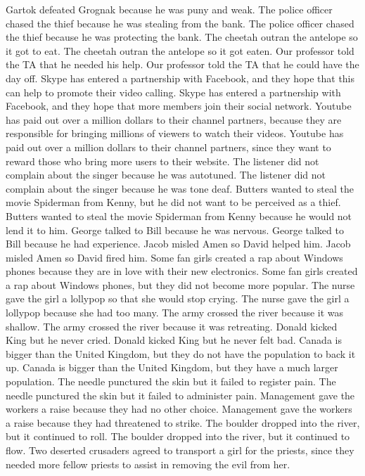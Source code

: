 \documentclass{article}
\begin{document}
\begin{enumerate}
	Gartok defeated Grognak because he was puny and weak.
	The police officer chased the thief because he was stealing from the bank.
	The police officer chased the thief because he was protecting the bank.
	The cheetah outran the antelope so it got to eat.
	The cheetah outran the antelope so it got eaten.
	Our professor told the TA that he needed his help.
	Our professor told the TA that he could have the day off.
	Skype has entered a partnership with Facebook, and they hope that this can help to promote their video calling.
	Skype has entered a partnership with Facebook, and they hope that more members join their social network.
	Youtube has paid out over a million dollars to their channel partners, because they are responsible for bringing millions of viewers to watch their videos.
	Youtube has paid out over a million dollars to their channel partners, since they want to reward those who bring more users to their website.
	The listener did not complain about the singer because he was autotuned.
	The listener did not complain about the singer because he was tone deaf.
	Butters wanted to steal the movie Spiderman from Kenny, but he did not want to be perceived as a thief.
	Butters wanted to steal the movie Spiderman from Kenny because he would not lend it to him.
	George talked to Bill because he was nervous.
	George talked to Bill because he had experience.
	Jacob misled Amen so David helped him.
	Jacob misled Amen so David fired him.
	Some fan girls created a rap about Windows phones because they are in love with their new electronics.
	Some fan girls created a rap about Windows phones, but they did not become more popular.
	The nurse gave the girl a lollypop so that she would stop crying.
	The nurse gave the girl a lollypop because she had too many.
	The army crossed the river because it was shallow.
	The army crossed the river because it was retreating.
	Donald kicked King but he never cried.
	Donald kicked King but he never felt bad.
	Canada is bigger than the United Kingdom, but they do not have the population to back it up.
	Canada is bigger than the United Kingdom, but they have a much larger population.
	The needle punctured the skin but it failed to register pain.
	The needle punctured the skin but it failed to administer pain.
	Management gave the workers a raise because they had no other choice.
	Management gave the workers a raise because they had threatened to strike.
	The boulder dropped into the river, but it continued to roll.
	The boulder dropped into the river, but it continued to flow.
	Two deserted crusaders agreed to transport a girl for the priests, since they needed more fellow priests to assist in removing the evil from her.

\end{enumerate}
\end{document}
